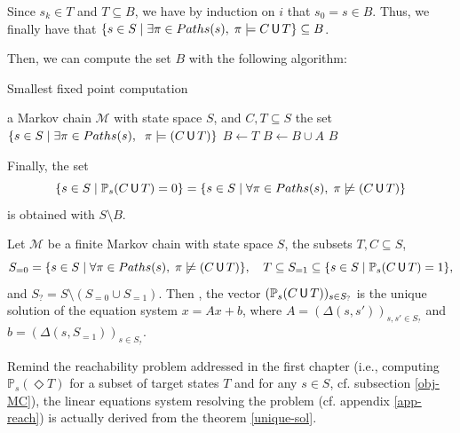 \begin{proof2}
\begin{enumerate}
  Since $s_k \in T$ and $T \subseteq B$, we have by induction on $i$ that $s_0=s \in B$. Thus, we finally have that $\{s \in S \; | \; \exists \pi \in Paths(s), \; \pi \models C \,\text{\sffamily U}\, T\} \subseteq B$.
\end{enumerate}
Then, we can compute the set $B$ with the following algorithm:
\begin{algorithm}[H]
\caption{Smallest fixed point computation}
\begin{algorithmic}[1]
  \REQUIRE a Markov chain $\mathcal{M}$ with state space $S$, and $C, T \subseteq S$
  \ENSURE the set $\{ s \in S \; | \; \exists \pi \in Paths(s), \;\; \pi \models (C \,\text{\sffamily U}\, T) \}$
  \STATE $B \leftarrow T$
    \STATE $B \leftarrow B \cup A$
  \ENDWHILE
  \RETURN $B$
\end{algorithmic}
\end{algorithm}
Finally, the set \[\{s \in S \; | \; \mathbb{P}_s(C \U T) = 0 \} = \{s \in S \; | \; \forall \pi \in Paths(s), \; \pi \centernot \models (C \U T) \}\] is obtained with $S \setminus B$.
\end{proof2}

\begin{theorem} \label{unique-sol}
Let $\mathcal{M}$ be a finite Markov chain with state space $S$, the subsets $T, C \subseteq S$,
\[
  S_{=0} = \{s \in S \; | \; \forall \pi \in Paths(s), \; \pi \centernot \models (C \U T) \}, \quad
  T \subseteq S_{=1} \subseteq \{s \in S \; | \; \mathbb{P}_s(C \U T) = 1 \},
\]
and $S_? = S \setminus (S_{=0} \cup S_{=1})$. Then , the vector $(\mathbb{P}_s(C \,\text{\sffamily U}\, T))_{s \in S_?}$ is the unique solution of the equation system $x = Ax+b$, where $A = (\Delta(s, s'))_{s, s' \in S_?}$ and $b = (\Delta(s, S_{=1}))_{s \in S_?}$.
\end{theorem}

\begin{remark}
  Remind the reachability problem addressed in the first chapter (i.e., computing $\mathbb{P}_s(\Diamond T)$ for a subset of target states $T$ and for any $s \in S$, cf. subsection \ref{obj-MC}), the linear equations system resolving the problem (cf. appendix \ref{app-reach}) is actually derived from the theorem \ref{unique-sol}.
\end{remark}

